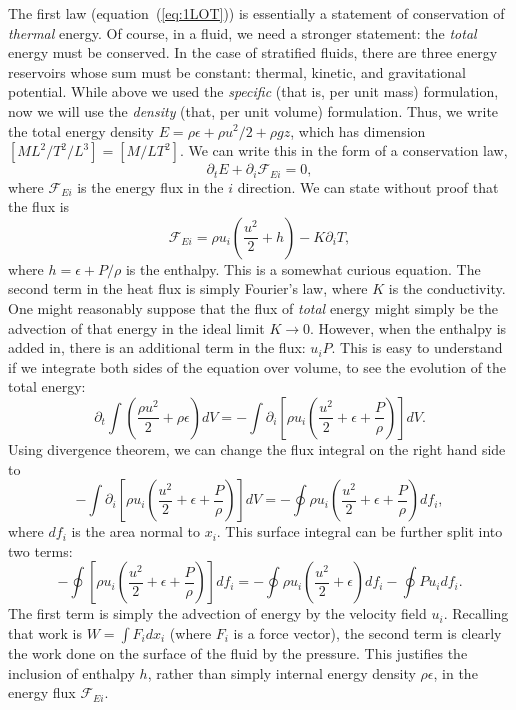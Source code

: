 \documentclass[letterpaper,12pt]{paper}
\begin{document}
The first law (equation~(\ref{eq:1LOT})) is essentially a statement of
conservation of \emph{thermal} energy. Of course, in a fluid, we need
a stronger statement: the \emph{total} energy must be conserved. In
the case of stratified fluids, there are three energy reservoirs whose
sum must be constant: thermal, kinetic, and gravitational
potential. While above we used the \emph{specific} (that is, per unit
mass) formulation, now we will use the \emph{density} (that, per unit
volume) formulation. Thus, we write the total energy density
$E = \rho \epsilon + \rho u^2/2 + \rho g z$, which has dimension $\left[ M
  L^2/T^2/L^3 \right] = \left[ M / L T^2 \right]$. We can write this in the form
of a conservation law,
\begin{equation}
  \label{eq:energy_conservation}
  \partial_t E  + \partial_i \mathcal{F}_{Ei} = 0,
\end{equation}
where $\mathcal{F}_{Ei}$ is the energy flux in the $i$
direction. We can state without proof that the flux is 
\begin{equation}
  \label{eq:energy_flux}
  \mathcal{F}_{Ei} = \rho u_i \left(\frac{u^2}{2} + h \right) -
  K \partial_i T,
\end{equation}
where $h = \epsilon + P/\rho$ is the enthalpy. This is a somewhat
curious equation. The second term in the heat flux is simply Fourier's
law, where $K$ is the conductivity. One might reasonably suppose that
the flux of \emph{total} energy might simply be the advection of that energy
in the ideal limit $K \rightarrow 0$. However, when the enthalpy is
added in, there is an additional term in the flux: $u_i P$. This is
easy to understand if we integrate both sides of the equation over
volume, to see the evolution of the total energy:
\begin{equation}
  \label{eq:total_energy}
  \partial_t \int \left(\frac{\rho u^2}{2} + \rho \epsilon \right) dV =
  - \int \partial_i \left[ \rho u_i \left( \frac{u^2}{2} + \epsilon + \frac{P}{\rho} \right)
  \right] dV.
\end{equation}
Using divergence theorem, we can change the flux integral on the right
hand side to 
\begin{equation}
  \label{eq:flux_int}
  - \int \partial_i \left[ \rho u_i \left( \frac{u^2}{2} + \epsilon + \frac{P}{\rho} \right)
  \right] dV  = - \oint \rho u_i \left( \frac{u^2}{2} + \epsilon + \frac{P}{\rho} \right)
  df_i,
\end{equation}
where $df_i$ is the area normal to $x_i$. This surface integral can be
further split into two terms:
\begin{equation}
  \label{eq:surf_int}
    - \oint \left[ \rho u_i \left( \frac{u^2}{2} + \epsilon + \frac{P}{\rho} \right)
  \right] df_i = -\oint \rho u_i \left( \frac{u^2}{2} + \epsilon
  \right) df_i - \oint P u_i df_i.
\end{equation}
The first term is simply the advection of energy by the velocity field
$u_i$. Recalling that work is $W = \int F_i dx_i$ (where $F_i$ is a
force vector), the second term is clearly the work done on the surface
of the fluid by the pressure. This justifies the inclusion of enthalpy
$h$, rather than simply internal energy density $\rho \epsilon$, in
the energy flux $\mathcal{F}_{Ei}$.
\end{document}
